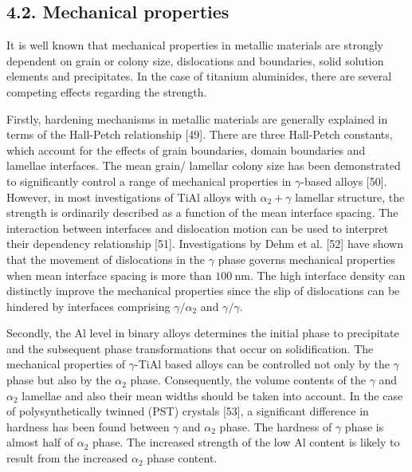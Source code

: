 \documentclass[10pt]{article}
\begin{document}
\subsection*{4.2. Mechanical properties}
It is well known that mechanical properties in metallic materials are strongly dependent on grain or colony size, dislocations and boundaries, solid solution elements and precipitates. In the case of titanium aluminides, there are several competing effects regarding the strength.

Firstly, hardening mechanisms in metallic materials are generally explained in terms of the Hall-Petch relationship [49]. There are three Hall-Petch constants, which account for the effects of grain boundaries, domain boundaries and lamellae interfaces. The mean grain/ lamellar colony size has been demonstrated to significantly control a range of mechanical properties in $\gamma$-based alloys [50]. However, in most investigations of TiAl alloys with $\alpha_{2}+\gamma$ lamellar structure, the strength is ordinarily described as a function of the mean interface spacing. The interaction between interfaces and dislocation motion can be used to interpret their dependency relationship [51]. Investigations by Dehm et al. [52] have shown that the movement of dislocations in the $\gamma$ phase governs mechanical properties when mean interface spacing is more than $100 \mathrm{~nm}$. The high interface density can distinctly improve the mechanical properties since the slip of dislocations can be hindered by interfaces comprising $\gamma / \alpha_{2}$ and $\gamma / \gamma$.

Secondly, the Al level in binary alloys determines the initial phase to precipitate and the subsequent phase transformations that occur on solidification. The mechanical properties of $\gamma$-TiAl based alloys can be controlled not only by the $\gamma$ phase but also by the $\alpha_{2}$ phase. Consequently, the volume contents of the $\gamma$ and $\alpha_{2}$ lamellae and also their mean widths should be taken into account. In the case of polysynthetically twinned (PST) crystals [53], a significant difference in hardness has been found between $\gamma$ and $\alpha_{2}$ phase. The hardness of $\gamma$ phase is almost half of $\alpha_{2}$ phase. The increased strength of the low Al content is likely to result from the increased $\alpha_{2}$ phase content.
\end{document}
